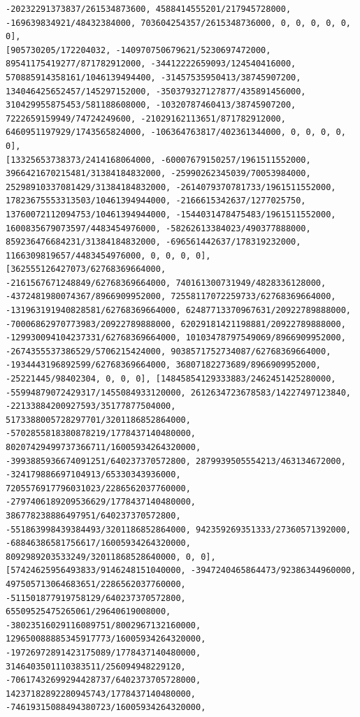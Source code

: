\documentclass[landscape,letterpaper,10pt,english]{article}
\begin{document}
\begin{Verbatim}[commandchars=\\\{\}]
-20232291373837/261534873600, 4588414555201/217945728000,
-169639834921/48432384000, 703604254357/2615348736000, 0, 0, 0, 0, 0, 0],
[905730205/172204032, -140970750679621/5230697472000,
89541175419277/871782912000, -34412222659093/124540416000,
570885914358161/1046139494400, -31457535950413/38745907200,
134046425652457/145297152000, -350379327127877/435891456000,
310429955875453/581188608000, -10320787460413/38745907200,
7222659159949/74724249600, -21029162113651/871782912000,
6460951197929/1743565824000, -106364763817/402361344000, 0, 0, 0, 0, 0],
[13325653738373/2414168064000, -60007679150257/1961511552000,
3966421670215481/31384184832000, -25990262345039/70053984000,
25298910337081429/31384184832000, -2614079370781733/1961511552000,
17823675553313503/10461394944000, -2166615342637/1277025750,
13760072112094753/10461394944000, -1544031478475483/1961511552000,
1600835679073597/4483454976000, -58262613384023/490377888000,
859236476684231/31384184832000, -696561442637/178319232000,
1166309819657/4483454976000, 0, 0, 0, 0], [362555126427073/62768369664000,
-2161567671248849/62768369664000, 740161300731949/4828336128000,
-4372481980074367/8966909952000, 72558117072259733/62768369664000,
-131963191940828581/62768369664000, 62487713370967631/20922789888000,
-70006862970773983/20922789888000, 62029181421198881/20922789888000,
-129930094104237331/62768369664000, 10103478797549069/8966909952000,
-2674355537386529/5706215424000, 9038571752734087/62768369664000,
-1934443196892599/62768369664000, 36807182273689/8966909952000,
-25221445/98402304, 0, 0, 0], [14845854129333883/2462451425280000,
-55994879072429317/1455084933120000, 2612634723678583/14227497123840,
-22133884200927593/35177877504000, 5173388005728297701/3201186852864000,
-5702855818380878219/1778437140480000, 80207429499737366711/16005934264320000,
-3993885936674091251/640237370572800, 2879939505554213/463134672000,
-324179886697104913/65330343936000, 7205576917796031023/2286562037760000,
-2797406189209536629/1778437140480000, 386778238886497951/640237370572800,
-551863998439384493/3201186852864000, 942359269351333/27360571392000,
-68846386581756617/16005934264320000, 8092989203533249/32011868528640000, 0, 0],
[57424625956493833/9146248151040000, -3947240465864473/92386344960000,
497505713064683651/2286562037760000, -511501877919758129/640237370572800,
65509525475265061/29640619008000, -38023516029116089751/8002967132160000,
129650088885345917773/16005934264320000, -19726972891423175089/1778437140480000,
3146403501110383511/256094948229120, -70617432699294428737/6402373705728000,
14237182892280945743/1778437140480000, -74619315088494380723/16005934264320000,

\end{Verbatim}
\end{document}
